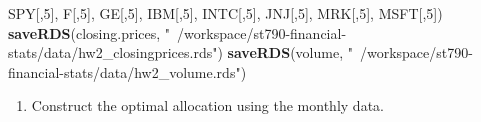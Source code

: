 \documentclass[11pt,]{article}
\newenvironment{Shaded}{\begin{snugshade}}{\end{snugshade}}
\newcommand{\KeywordTok}[1]{\textcolor[rgb]{0.13,0.29,0.53}{\textbf{#1}}}
\newcommand{\DecValTok}[1]{\textcolor[rgb]{0.00,0.00,0.81}{#1}}
\newcommand{\StringTok}[1]{\textcolor[rgb]{0.31,0.60,0.02}{#1}}
\newcommand{\NormalTok}[1]{#1}
\providecommand{\tightlist}{%
\setlength{\itemsep}{0pt}\setlength{\parskip}{0pt}}
\begin{document}
\begin{Shaded}
\begin{Highlighting}[]
\NormalTok{                            SPY[,}\DecValTok{5}\NormalTok{], }
\NormalTok{                            F[,}\DecValTok{5}\NormalTok{], }
\NormalTok{                            GE[,}\DecValTok{5}\NormalTok{], }
\NormalTok{                            IBM[,}\DecValTok{5}\NormalTok{], }
\NormalTok{                            INTC[,}\DecValTok{5}\NormalTok{], }
\NormalTok{                            JNJ[,}\DecValTok{5}\NormalTok{], }
\NormalTok{                            MRK[,}\DecValTok{5}\NormalTok{], }
\NormalTok{                            MSFT[,}\DecValTok{5}\NormalTok{])}
\KeywordTok{saveRDS}\NormalTok{(closing.prices, }\StringTok{"~/workspace/st790-financial-stats/data/hw2_closingprices.rds"}\NormalTok{)}
\KeywordTok{saveRDS}\NormalTok{(volume, }\StringTok{"~/workspace/st790-financial-stats/data/hw2_volume.rds"}\NormalTok{)}
\end{Highlighting}
\end{Shaded}

\begin{enumerate}
\def\labelenumi{\arabic{enumi}.}
\setcounter{enumi}{1}
\tightlist
\item
  Construct the optimal allocation using the monthly data.
\end{enumerate}
\end{document}
